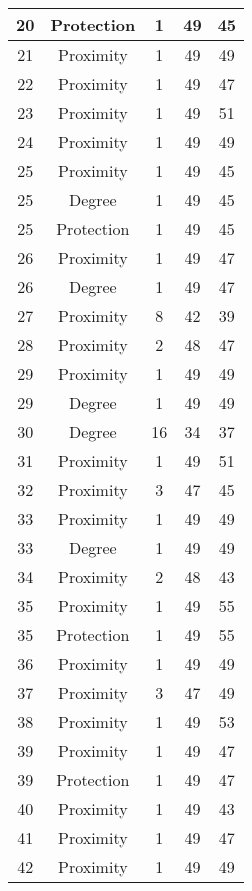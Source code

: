 \documentclass[results.tex]{subfiles}
\begin{document}
\begin{center}
\begin{tabular}{| c || c | c | c | c |}
    \hline
    20 & Protection & 1 & 49 & 45 \\ 
    \hline
    21 & Proximity & 1 & 49 & 49 \\ 
    \hline
    22 & Proximity & 1 & 49 & 47 \\ 
    \hline
    23 & Proximity & 1 & 49 & 51 \\ 
    \hline
    24 & Proximity & 1 & 49 & 49 \\ 
    \hline
    25 & Proximity & 1 & 49 & 45 \\ 
    \hline
    25 & Degree & 1 & 49 & 45 \\ 
    \hline
    25 & Protection & 1 & 49 & 45 \\ 
    \hline
    26 & Proximity & 1 & 49 & 47 \\ 
    \hline
    26 & Degree & 1 & 49 & 47 \\ 
    \hline
    27 & Proximity & 8 & 42 & 39 \\ 
    \hline
    28 & Proximity & 2 & 48 & 47 \\ 
    \hline
    29 & Proximity & 1 & 49 & 49 \\ 
    \hline
    29 & Degree & 1 & 49 & 49 \\ 
    \hline
    30 & Degree & 16 & 34 & 37 \\ 
    \hline
    31 & Proximity & 1 & 49 & 51 \\ 
    \hline
    32 & Proximity & 3 & 47 & 45 \\ 
    \hline
    33 & Proximity & 1 & 49 & 49 \\ 
    \hline
    33 & Degree & 1 & 49 & 49 \\ 
    \hline
    34 & Proximity & 2 & 48 & 43 \\ 
    \hline
    35 & Proximity & 1 & 49 & 55 \\ 
    \hline
    35 & Protection & 1 & 49 & 55 \\ 
    \hline
    36 & Proximity & 1 & 49 & 49 \\ 
    \hline
    37 & Proximity & 3 & 47 & 49 \\ 
    \hline
    38 & Proximity & 1 & 49 & 53 \\ 
    \hline
    39 & Proximity & 1 & 49 & 47 \\ 
    \hline
    39 & Protection & 1 & 49 & 47 \\ 
    \hline
    40 & Proximity & 1 & 49 & 43 \\ 
    \hline
    41 & Proximity & 1 & 49 & 47 \\ 
    \hline
    42 & Proximity & 1 & 49 & 49 \\ 

\end{tabular}
\end{center}
\end{document}
